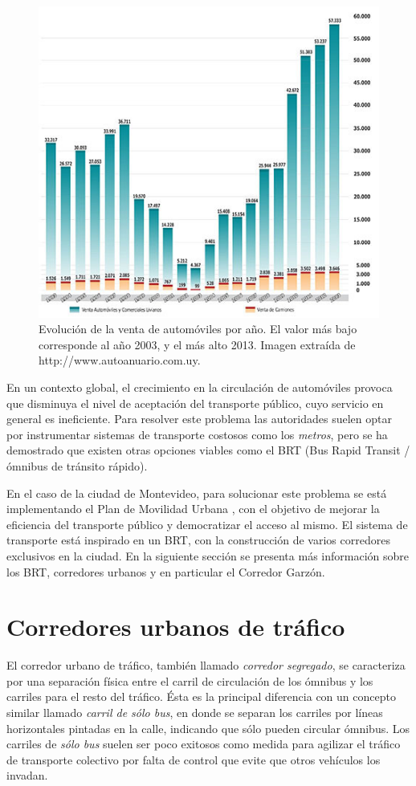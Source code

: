 \begin{figure}[ht]
	\centering
	\includegraphics[width=0.9\linewidth]{Figures/ventas_autos}
	\caption[Evolución de la venta de automóviles en Uruguay]{Evolución de la venta de automóviles por año. El valor más bajo corresponde al año 2003, y el más alto 2013. Imagen extraída de {http://www.autoanuario.com.uy}.}
	\label{fig:ventas_autos}
\end{figure}

En un contexto global, el crecimiento en la circulación de automóviles provoca que disminuya el nivel de aceptación del transporte público, cuyo servicio en general es ineficiente. Para resolver este problema las autoridades suelen optar por instrumentar sistemas de transporte costosos como los \emph{metros}, pero se ha demostrado que existen otras opciones viables como el BRT (Bus Rapid Transit / ómnibus de tránsito rápido)\citep{BRT_Dial}.

En el caso de la ciudad de Montevideo, para solucionar este problema se está implementando el Plan de Movilidad Urbana \citep{PlanMovilidad}, con el objetivo de mejorar la eficiencia del transporte público y democratizar el acceso al mismo. El sistema de transporte está inspirado en un BRT, con la construcción de varios corredores exclusivos en la ciudad. En la siguiente sección se presenta más información sobre los BRT, corredores urbanos y en particular el Corredor Garzón.

\section{Corredores urbanos de tráfico}
El corredor urbano de tráfico, también llamado \emph{corredor segregado}, se caracteriza por una separación física entre el carril de circulación de los ómnibus y los carriles para el resto del tráfico. 
Ésta es la principal diferencia con un concepto similar llamado \emph{carril de sólo bus}, en donde se separan los carriles por líneas horizontales pintadas en la calle, indicando que sólo pueden circular ómnibus. Los carriles de \emph{sólo bus} suelen ser poco exitosos como medida para agilizar el tráfico de transporte colectivo por falta de control que evite que otros vehículos los invadan. 


